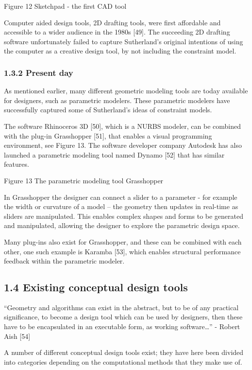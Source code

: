 Figure 12 Sketchpad - the first CAD tool

Computer aided design tools, 2D drafting tools, were first affordable and accessible to a wider audience in the 1980s [49]. The succeeding 2D drafting software unfortunately failed to capture Sutherland’s original intentions of using the computer as a creative design tool, by not including the constraint model. 

\subsubsection[1.3.2 Present day]{1.3.2 Present day}
As mentioned earlier, many different geometric modeling tools are today available for designers, such as parametric modelers. These parametric modelers have successfully captured some of Sutherland’s ideas of constraint models. 



The software Rhinoceros 3D [50], which is a NURBS modeler, can be combined with the plug-in Grasshopper [51], that enables a visual programming environment, see Figure 13. The software developer company Autodesk has also launched a parametric modeling tool named Dynamo [52] that has similar features.


Figure 13 The parametric modeling tool Grasshopper

In Grasshopper the designer can connect a slider to a parameter - for example the width or curvature of a model – the geometry then updates in real-time as sliders are manipulated. This enables complex shapes and forms to be generated and manipulated, allowing the designer to explore the parametric design space. 



Many plug-ins also exist for Grasshopper, and these can be combined with each other, one such example is Karamba [53], which enables structural performance feedback within the parametric modeler. 

\subsection[1.4 Existing conceptual design tools]{1.4 Existing conceptual design tools}
“Geometry and algorithms can exist in the abstract, but to be of any practical significance, to become a design tool which can be used by designers, then these have to be encapsulated in an executable form, as working software…” - Robert Aish [54]

A number of different conceptual design tools exist; they have here been divided into categories depending on the computational methods that they make use of.



